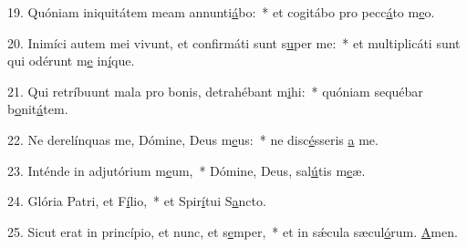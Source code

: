 19. Quóniam iniquitátem meam annunti\uline{á}bo:~* et cogitábo pro pecc\uline{á}to m\uline{e}o.\par 
20. Inimíci autem mei vivunt, et confirmáti sunt s\uline{u}per me:~* et multiplicáti sunt qui odérunt m\uline{e} in\uline{í}que.\par 
21. Qui retríbuunt mala pro bonis, detrahébant m\uline{i}hi:~* quóniam sequébar b\uline{o}nit\uline{á}tem.\par 
22. Ne derelínquas me, Dómine, Deus m\uline{e}us:~* ne disc\uline{é}sseris \uline{a} me.\par 
23. Inténde in adjutórium m\uline{e}um,~* Dómine, Deus, sal\uline{ú}tis m\uline{e}æ.\par 
24. Glória Patri, et F\uline{í}lio,~* et Spir\uline{í}tui S\uline{a}ncto.\par 
25. Sicut erat in princípio, et nunc, et s\uline{e}mper,~* et in sǽcula sæcul\uline{ó}rum. \uline{A}men.\par 
